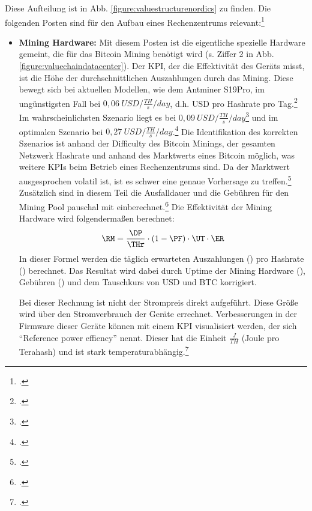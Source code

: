 Diese Aufteilung ist in Abb. \ref{figure:valuestructurenordics} zu finden. Die folgenden Posten sind für den Aufbau
eines Rechenzentrums relevant:\footcite[Cf.][]{appendix:capex}
\begin{itemize}
    \item \textbf{Mining Hardware: }Mit diesem Posten ist die eigentliche spezielle Hardware gemeint, die für das
    Bitcoin Mining benötigt wird (s. Ziffer 2 in Abb. \ref{figure:valuechaindatacenter}). Der \ac{KPI}, der die
    Effektivität des Geräts misst, ist die Höhe der durchschnittlichen Auszahlungen durch das Mining. Diese bewegt
    sich bei aktuellen Modellen, wie dem Antminer S19Pro, im ungünstigsten Fall bei $0,06\ USD / \frac{TH}{s} / day$, d.h.
    \ac{USD} pro Hashrate pro Tag.\footcite[Cf.][]{appendix:worstcasescenario} Im wahrscheinlichsten Szenario liegt
    es bei $0,09\ USD / \frac{TH}{s} / day$\footcite[Cf.][]{appendix:mostprobablescenario} und im optimalen Szenario
    bei $0,27\ USD / \frac{TH}{s} / day$.\footcite[Cf.][]{appendix:optimalscenario} Die Identifikation des korrekten
    Szenarios ist anhand der Difficulty des Bitcoin Minings, der gesamten Netzwerk Hashrate und anhand des Marktwerts
    eines Bitcoin möglich, was weitere \acp{KPI} beim Betrieb eines Rechenzentrums sind. Da der Marktwert ausgesprochen
    volatil ist, ist es schwer eine genaue Vorhersage zu treffen.\footcite[Cf.][p. 325]{badertscher2017bitcoin} Zusätzlich
    sind in diesem Teil die Ausfalldauer und die Gebühren für den Mining Pool pauschal mit
    einberechnet.\footcite[Cf.][]{appendix:s19proassumptions} Die Effektivität der Mining Hardware wird folgendermaßen
    berechnet:
    \begin{equation}
        \RM = \frac{\DP}{\THr}\cdot(1-\PF)\cdot\UT\cdot\ER
    \end{equation}
    In dieser Formel werden die täglich erwarteten Auszahlungen (\DP) pro Hashrate (\THr) berechnet. Das Resultat wird
    dabei durch Uptime der Mining Hardware (\UT), Gebühren (\PF) und dem Tauschkurs von \ac{USD} und \ac{BTC} korrigiert.

    Bei dieser Rechnung ist nicht der Strompreis direkt aufgeführt. Diese Größe wird über den Stromverbrauch der Geräte
    errechnet. Verbesserungen in der Firmware dieser Geräte können mit einem \ac{KPI} visualisiert werden, der sich
    "`Reference power effiency"' nennt. Dieser hat die Einheit $\frac{J}{TH}$ (Joule pro Terahash) und ist stark
    temperaturabhängig.\footcite[Cf.][]{s19pro2021consumption}


\end{itemize}
